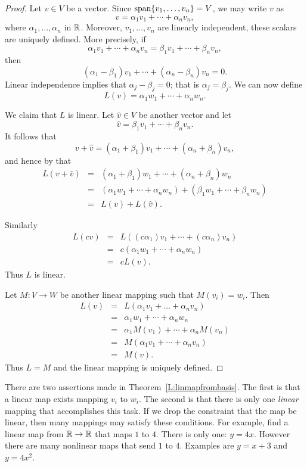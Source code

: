 \documentclass{ximera}
\begin{document}
\begin{proof} Let $v\in V$ be a vector.  Since ${\rm span}\{v_1,\ldots,v_n\}=V$, we may
write $v$ as
\[
v = \alpha_1v_1 + \cdots + \alpha_nv_n,
\]
where $\alpha_1,\ldots,\alpha_n$ in $\mbox{$\Bbb{R}$}$.   Moreover, $v_1,\ldots,v_n$
are linearly independent, these scalars are uniquely defined.  More
precisely, if
\[
\alpha_1v_1 + \cdots + \alpha_nv_n = \beta_1v_1 + \cdots + \beta_nv_n,
\]
then
\[
(\alpha_1-\beta_1)v_1 + \cdots + (\alpha_n-\beta_n)v_n = 0.
\]
Linear independence implies that $\alpha_j-\beta_j=0$; that is
$\alpha_j=\beta_j$.   We can now define
\begin{equation}  \label{e:v-coord}
L(v) = \alpha_1 w_1+\cdots+\alpha_n w_n.
\end{equation}

We claim that $L$ is linear.  Let $\hat{v}\in V$ be another
vector and let
\[
\hat{v} = \beta_1v_1+\cdots+\beta_nv_n.
\]
It follows that
\[
v+\hat{v} = (\alpha_1+\beta_1)v_1+\cdots+(\alpha_n+\beta_n)v_n,
\]
and hence by  that
\begin{eqnarray*}
L(v+\hat{v}) & = &
(\alpha_1+\beta_1)w_1+\cdots+(\alpha_n+\beta_n)w_n\\
& = & (\alpha_1w_1+\cdots+\alpha_nw_n) +
(\beta_1w_1+\cdots+\beta_nw_n)  \\
& = & L(v) + L(\hat{v}).
\end{eqnarray*}

Similarly
\begin{eqnarray*}
L(cv) &  = & L( (c\alpha_1)v_1+\cdots +(c\alpha_n)v_n)\\
& = & c(\alpha_1w_1+\cdots+\alpha_nw_n)\\
& = & cL(v).
\end{eqnarray*}
Thus $L$ is linear.

Let $M:V\to W$ be another linear mapping such that $M(v_i)=w_i$.
Then
\begin{eqnarray*}
L(v) & = & L(\alpha_1v_1+\ldots +\alpha_nv_n)\\
& = & \alpha_1w_1+\cdots+\alpha_nw_n \\
& = & \alpha_1M(v_1) + \cdots +\alpha_nM(v_n)\\
& = & M(\alpha_1v_1 + \cdots +\alpha_nv_n)\\
& = & M(v).
\end{eqnarray*}
Thus $L=M$ and the linear mapping is uniquely defined.  \end{proof}


There are two assertions made in Theorem~\ref{L:linmapfrombasis}.
The first is that a linear map exists mapping $v_i$ to $w_i$.
The second is that there is only one {\em linear\/} mapping
that accomplishes this task.  If we drop the constraint that the
map be linear, then many mappings may satisfy these conditions.
For example, find a linear map from $\mbox{$\Bbb{R}$}\to\mbox{$\Bbb{R}$}$ that maps $1$ to $4$.
There is only one: $y=4x$.  However there are many nonlinear maps
that send $1$ to $4$.  Examples are $y=x+3$ and $y=4x^2$.
\end{document}
